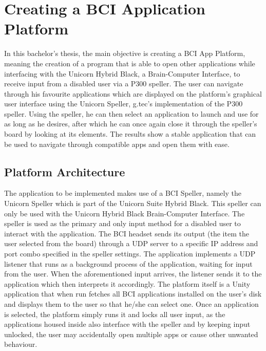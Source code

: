 
\chapter{Creating a BCI Application Platform}\label{cap:development}
In this bachelor's thesis, the main objective is creating a BCI App Platform, meaning the creation of a program that is able to open other applications while interfacing with the Unicorn Hybrid Black, a Brain-Computer Interface, to receive input from a disabled user via a P300 speller. The user can navigate through his favourite applications which are displayed on the platform's graphical user interface using the Unicorn Speller, g.tec's implementation of the P300 speller. Using the speller, he can then select an application to launch and use for as long as he desires, after which he can once again close it through the speller's board by looking at its elements. The results show a stable application that can be used to navigate through compatible apps and open them with ease.

\section{Platform Architecture}
The application to be implemented makes use of a BCI Speller, namely the Unicorn Speller which is part of the Unicorn Suite Hybrid Black. This speller can only be used with the Unicorn Hybrid Black Brain-Computer Interface. The speller is used as the primary and only input method for a disabled user to interact with the application. The BCI headset sends its output (the item the user selected from the board) through a UDP server to a specific IP address and port combo specified in the speller settings. The application implements a UDP listener that runs as a background process of the application, waiting for input from the user. When the aforementioned input arrives, the listener sends it to the application which then interprets it accordingly.
\vspace{\baselineskip}\newline
The platform itself is a Unity application that when run fetches all BCI applications installed on the user's disk and displays them to the user so that he/she can select one. Once an application is selected, the platform simply runs it and locks all user input, as the applications housed inside also interface with the speller and by keeping input unlocked, the user may accidentally open multiple apps or cause other unwanted behaviour.

